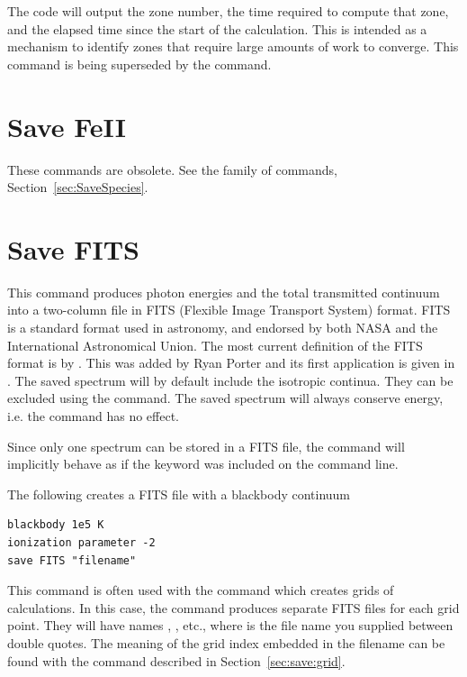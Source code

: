 The code will output the zone number, the time required to compute that
zone, and the elapsed time since the start of the calculation.  This is
intended as a mechanism to identify zones that require large amounts of
work to converge.  
This command is being superseded by the  command.

\section{Save FeII}
\label{sec:CommandSaveFeII}

These commands are obsolete.
See the  family of commands,
Section~\ref{sec:SaveSpecies}.

\section{Save FITS}

This command produces photon energies and the total transmitted continuum into
a two-column file in FITS (Flexible Image Transport System) format.  FITS
is a standard format used in astronomy, and endorsed by both NASA and the
International Astronomical Union.  The most current definition of the FITS
format is by \citet{Hanisch2001}.  This was added by Ryan Porter and its
first application is given in \citet{Porter2006}.  The saved spectrum will
by default include the isotropic continua.  They can be excluded using the
 command.  The saved spectrum will
always conserve energy, i.e. the  command
has no effect.

Since only one spectrum can be stored in a FITS file, the command will
implicitly behave as if the keyword  was included on the
command line.

The following creates a FITS file with a blackbody continuum
\begin{verbatim}
blackbody 1e5 K
ionization parameter -2
save FITS "filename"
\end{verbatim}

This command is often used with the  command which creates
grids of calculations. In this case, the command produces separate FITS files
for each grid point. They will have names
, ,
etc., where  is the file name you supplied between double
quotes. The meaning of the grid index embedded in the filename can be found with
the  command described in Section~\ref{sec:save:grid}.

